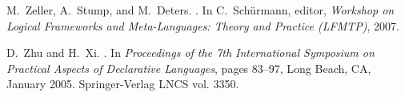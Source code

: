 \documentclass[9pt,natbib]{sigplanconf}
\begin{document}
\begin{thebibliography}{28}
M.~Zeller, A.~Stump, and M.~Deters.
.
\newblock In C.~Sch{\"u}rmann, editor, \emph{Workshop on Logical Frameworks and
  Meta-Languages: Theory and Practice (LFMTP)}, 2007.

D.~Zhu and H.~Xi.
.
\newblock In \emph{Proceedings of the 7th International Symposium on Practical
  Aspects of Declarative Languages}, pages 83--97, Long Beach, CA, January
  2005. Springer-Verlag LNCS vol. 3350.

\end{thebibliography}
\end{document}
